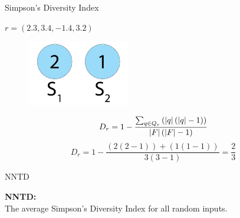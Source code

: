 \begin{frame}{Simpson's Diversity Index}
\begin{center}
$r = (2.3, 3.4, -1.4, 3.2)$
  \begin{figure}[p]
  \includegraphics[width=0.4\textwidth]{images/speciessize.png}
  \end{figure}
\begin{equation}
D_r = 1 - \frac{\sum_{q \in Q_{r}}\left(\lvert q\rvert\left(\lvert q\rvert - 1\right)\right)}{\lvert F\rvert\left(\lvert F\rvert - 1\right)}
\end{equation}
\begin{equation}\label{eq:nntd}
D_r = 1 - \frac{(2(2-1))+(1(1-1))}{3(3-1)} = \frac{2}{3}
\end{equation}
\end{center}
\end{frame}

\begin{frame}{NNTD}
\begin{center}
\textbf{NNTD:}\\
The average Simpson's Diversity Index for all random inputs.
\end{center}
\end{frame}





